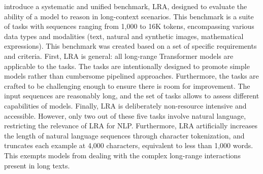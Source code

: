 \citet{tay2020long} introduce a systematic and unified benchmark, \ac{LRA}, designed to evaluate the ability of a model to reason in long-context scenarios. This benchmark is a suite of tasks with sequences ranging from 1,000 to 16K tokens, encompassing various data types and modalities (text, natural and synthetic images, mathematical expressions). This benchmark was created based on a set of specific requirements and criteria. First, \ac{LRA} is general: all long-range Transformer models are applicable to the tasks. The tasks are intentionally designed to promote simple models rather than cumbersome pipelined approaches. Furthermore, the tasks are crafted to be challenging enough to ensure there is room for improvement. The input sequences are reasonably long, and the set of tasks allows to assess different capabilities of models. Finally, \ac{LRA} is deliberately non-resource intensive and accessible. However, only two out of these five tasks involve natural language, restricting the relevance of \ac{LRA} for \ac{NLP}. Furthermore, \ac{LRA} artificially increases the length of natural language sequences through character tokenization, and truncates each example at 4,000 characters, equivalent to less than 1,000 words. This exempts models from dealing with the complex long-range interactions present in long texts.


